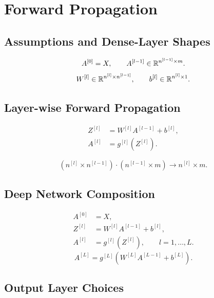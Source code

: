 \section{Forward Propagation}

\subsection{Assumptions and Dense-Layer Shapes}

\[
A^{[0]} = X,
\qquad
A^{[l-1]} \in \mathbb{R}^{n^{[l-1]} \times m}.
\]
\[
W^{[l]} \in \mathbb{R}^{n^{[l]} \times n^{[l-1]}},
\qquad
b^{[l]} \in \mathbb{R}^{n^{[l]} \times 1}.
\]

\subsection{Layer-wise Forward Propagation}

\[
\begin{aligned}
Z^{[l]} &= W^{[l]}A^{[l-1]} + b^{[l]},\\
A^{[l]} &= g^{[l]}(Z^{[l]}).
\end{aligned}
\]

\[
(n^{[l]} \times n^{[l-1]})
\cdot
(n^{[l-1]} \times m)
\longrightarrow
n^{[l]} \times m.
\]

\subsection{Deep Network Composition}

\[
\begin{aligned}
A^{[0]} &= X,\\
Z^{[l]} &= W^{[l]}A^{[l-1]} + b^{[l]},\\
A^{[l]} &= g^{[l]}(Z^{[l]}),
\qquad l=1,\dots,L.
\end{aligned}
\]
\[
A^{[L]}
=
g^{[L]}
\left(
W^{[L]}A^{[L-1]} + b^{[L]}
\right).
\]

\subsection{Output Layer Choices}

